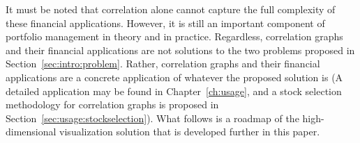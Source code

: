 It must be noted that correlation alone cannot capture the full complexity of these financial applications. However, it is still an important component of portfolio management in theory and in practice. Regardless, correlation graphs and their financial applications are not solutions to the two problems proposed in Section~\ref{sec:intro:problem}. Rather, correlation graphs and their financial applications are a concrete application of whatever the proposed solution is (A detailed application may be found in Chapter~\ref{ch:usage}, and a stock selection methodology for correlation graphs is proposed in Section~\ref{sec:usage:stockselection}). What follows is a roadmap of the high-dimensional visualization solution that is developed further in this paper. 